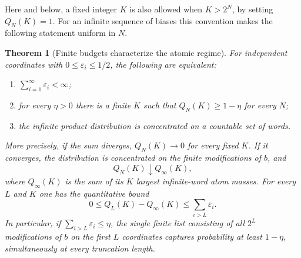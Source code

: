 \documentclass[11pt]{article}
\numberwithin{equation}{section}
\newtheorem{theorem}{Theorem}[section]
\theoremstyle{definition}
\theoremstyle{remark}
\begin{document}
Here and below, a fixed integer $K$ is also allowed when $K>2^N$, by setting
$Q_N(K)=1$.  For an infinite sequence of biases this convention makes the
following statement uniform in $N$.

\begin{theorem}[Finite budgets characterize the atomic regime]
\label{rbc:thm:budget-atomic}
For independent coordinates with $0\le\varepsilon_i\le1/2$, the following
are equivalent:
\begin{enumerate}
\item $\sum_{i=1}^{\infty}\varepsilon_i<\infty$;
\item for every $\eta>0$ there is a finite $K$ such that
      $Q_N(K)\ge1-\eta$ for every $N$;
\item the infinite product distribution is concentrated on a countable
      set of words.
\end{enumerate}
More precisely, if the sum diverges, $Q_N(K)\to0$ for every fixed $K$.
If it converges, the distribution is concentrated on the finite
modifications of $b$, and
\[
 Q_N(K)\downarrow Q_\infty(K),
\]
where $Q_\infty(K)$ is the sum of its $K$ largest infinite-word atom masses.
For every $L$ and $K$ one has the quantitative bound
\[
 0\le Q_L(K)-Q_\infty(K)
 \le \sum_{i>L}\varepsilon_i.
\]
In particular, if $\sum_{i>L}\varepsilon_i\le\eta$, the single finite
list consisting of all $2^L$ modifications of $b$ on the first $L$
coordinates captures probability at least $1-\eta$, simultaneously at
every truncation length.
\end{theorem}
\end{document}
